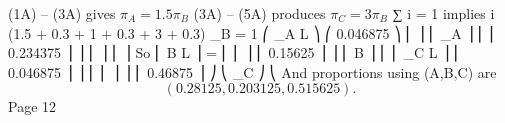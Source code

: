 \documentclass[a4paper,12pt]{article}
\begin{document}
(1A) – (3A) gives
$\pi_A = 1.5 \pi_B$
(3A) – (5A) produces
$\pi_C = 3 \pi_B$
∑
\pi i = 1 implies
i
(1.5 + 0.3 + 1 + 0.3 + 3 + 0.3) \pi_B = 1
⎛ \pi_A L ⎞ ⎛ 0.046875 ⎞
⎜
⎟
⎜ \pi_A ⎟ ⎜ ⎜ 0.234375 ⎟ ⎟
⎜
⎟ ⎜
 ⎟
So ⎜ B L ⎟ = ⎜
⎜ \pi ⎟ ⎜ 0.15625 ⎟ ⎟
⎜ B ⎟ ⎜
⎜ \pi_C L ⎟ ⎜ 0.046875 ⎟ ⎟
⎜ ⎜
⎟ ⎟ ⎜ 0.46875 ⎟ ⎠
⎝ \pi_C ⎠ ⎝
And proportions using (A,B,C) are
\[(0.28125, 0.203125, 0.515625).\]
Page 12%
\end{document}
